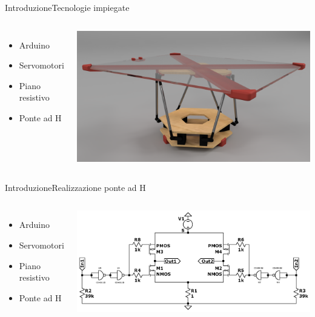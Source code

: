 \documentclass[10pt,aspectratio=169
	]{beamer}
\begin{document}
	\begin{frame}{Introduzione}{Tecnologie impiegate}

	\begin{columns}
	
	\begin{itemize}
		\item Arduino
		\item Servomotori
		\item Piano resistivo
		\item Ponte ad H
	\end{itemize}
	\centering \includegraphics[width=\textwidth]{./images/stewart.png}
	\end{columns}
	\end{frame}
	
	\begin{frame}{Introduzione}{Realizzazione ponte ad H}

	\begin{columns}
	\column{0.3\textwidth}
	
	\begin{itemize}
		\item Arduino
		\item Servomotori
		\item Piano resistivo
		\item Ponte ad H
	\end{itemize}
	\column{0.7\textwidth}
	\centering
	\includegraphics[width=\textwidth]{./images/circuit3.png}
	\end{columns}
	\end{frame}
	
\end{document}
